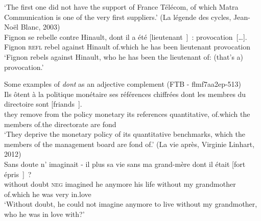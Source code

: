 \glt `The first one did not have the support of France Télécom, of which Matra Communication is one of the very first suppliers.'
\ex (La légende des cycles, Jean-No\"{e}l Blanc, 2003)\nopagebreak\\
\gll Fignon se rebelle contre Hinault, dont il a été [lieutenant~\trace{}]~: provocation~[\dots].\\
Fignon \textsc{refl} rebel against Hinault of.which he has been lieutenant provocation\\
\glt `Fignon rebels against Hinault, who he has been the lieutenant of: (that's a) provocation.'
\z 

\ex Some examples of \emph{dont} as an adjective complement 
\ea (FTB - flmf7aa2ep-513)\\
\gll Ils ôtent à la politique monétaire ses références chiffrées dont les  membres  du  directoire  sont [friands~\trace{}].\\
they remove from the policy monetary its references quantitative, of.which the members of.the directorate are fond\\
\glt `They deprive the monetary policy of its quantitative benchmarks, which the members of the management board are fond of.'
\label{ex:FTB-adjective}
\ex (La vie après, Virginie Linhart, 2012)\\
\gll Sans doute n' imaginait - il plus sa vie sans ma grand-mère dont il était [fort épris~\trace{}]~?\\
without doubt \textsc{neg} imagined {} he anymore his life without my grandmother of.which he was very in.love\\
\glt `Without doubt, he could not imagine anymore to live without my grandmother, who he was in love with?'
\label{ex:d2000-adjective}
\z

